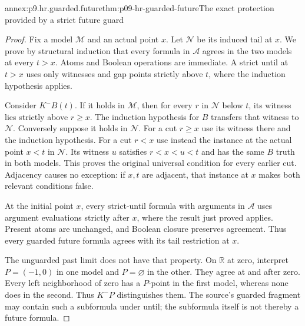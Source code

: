 \begin{annexitem}{annex:p9.hr.guarded.future}{thm:p09-hr-guarded-future}{The exact protection provided by a strict future guard}
\begin{proof}
Fix a model
\(\mathcal M\)
and an actual
point \(x\).
Let \(\mathcal N\)
be its induced
tail at \(x\).
We prove by
structural
induction that
every formula
in \(\mathcal A\)
agrees in
the two models
at every
\(t>x\).
Atoms and
Boolean
operations
are immediate.
A strict
until at
\(t>x\)
uses only
witnesses and
gap points
strictly above
\(t\), where
the induction
hypothesis
applies.

Consider
\(K^-B(t)\).
If it holds
in \(\mathcal M\),
then for every
\(r\) in
\(\mathcal N\)
below \(t\),
its witness
lies strictly
above \(r\geq x\).
The induction
hypothesis
for \(B\)
transfers that
witness to
\(\mathcal N\).
Conversely
suppose it
holds in
\(\mathcal N\).
For a cut
\(r\geq x\)
use its
witness there
and the
induction
hypothesis.
For a cut
\(r<x\)
use instead
the instance
at the
actual point
\(x<t\)
in \(\mathcal N\).
Its witness
\(u\) satisfies
\(r<x<u<t\)
and has the
same \(B\)
truth in
both models.
This proves
the original
universal
condition for
every earlier
cut. Adjacency
causes no
exception:
if \(x,t\)
are adjacent,
that instance
at \(x\)
makes both
relevant
conditions
false.

At the
initial point
\(x\), every
strict-until
formula with
arguments in
\(\mathcal A\)
uses argument
evaluations
strictly after
\(x\), where
the result
just proved
applies.
Present atoms
are unchanged,
and Boolean
closure preserves
agreement.
Thus every
guarded future
formula agrees
with its tail
restriction
at \(x\).

The unguarded
past limit
does not have
that property.
On \(\mathbb R\)
at zero,
interpret
\(P=(-1,0)\)
in one model
and \(P=\varnothing\)
in the other.
They agree
at and after
zero. Every
left neighborhood
of zero has
a \(P\)-point
in the first
model, whereas
none does in
the second.
Thus \(K^-P\)
distinguishes
them. The
source's guarded
fragment may
contain such
a subformula
under until;
the subformula
itself is
not thereby
a future
formula.
\end{proof}
\end{annexitem}
